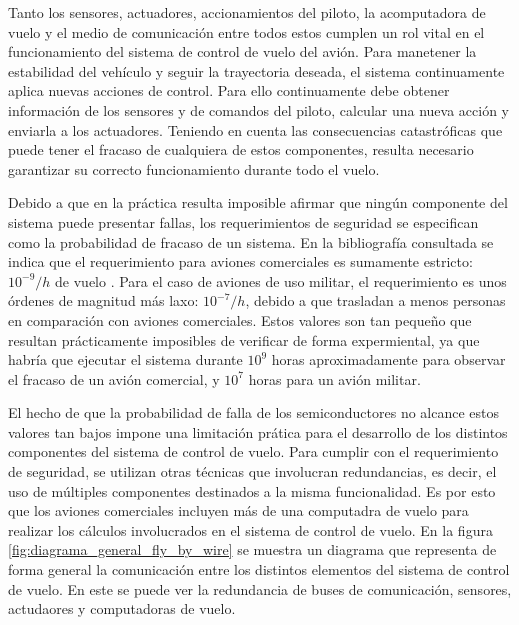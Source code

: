 Tanto los sensores, actuadores, accionamientos del piloto, la acomputadora de vuelo y el medio de comunicación entre todos estos cumplen un rol vital en el funcionamiento del sistema de control de vuelo del avión. Para manetener la estabilidad del vehículo y seguir la trayectoria deseada, el sistema continuamente aplica nuevas acciones de control. Para ello continuamente debe obtener información de los sensores y de comandos del piloto, calcular una nueva acción y enviarla a los actuadores. Teniendo en cuenta las consecuencias catastróficas que puede tener el fracaso de cualquiera de estos componentes, resulta necesario garantizar su correcto funcionamiento durante todo el vuelo.

Debido a que en la práctica resulta imposible afirmar que ningún componente del sistema puede presentar fallas, los requerimientos de seguridad se especifican como la probabilidad de fracaso de un sistema. En la bibliografía consultada se indica que el requerimiento para aviones comerciales es sumamente estricto: $10^{-9}/h$ de vuelo \cite[p.~217]{collinson2023introduction} \cite{yeh1996triple} \cite{lala1994architectural}. Para el caso de aviones de uso militar, el requerimiento es unos órdenes de magnitud más laxo: $10^{-7}/h$, debido a que trasladan a menos personas en comparación con aviones comerciales. Estos valores son tan pequeño que resultan prácticamente imposibles de verificar de forma expermiental, ya que habría que ejecutar el sistema durante $10^9$ horas aproximadamente para observar el fracaso de un avión comercial, y $10^7$ horas para un avión militar.

El hecho de que la probabilidad de falla de los semiconductores no alcance estos valores tan bajos \cite[p.~4]{Fulton2014AirborneEH} impone una limitación prática para el desarrollo de los distintos componentes del sistema de control de vuelo. Para cumplir con el requerimiento de seguridad, se utilizan otras técnicas que involucran redundancias, es decir, el uso de múltiples componentes destinados a la misma funcionalidad. Es por esto que los aviones comerciales incluyen más de una computadra de vuelo para realizar los cálculos involucrados en el sistema de control de vuelo. En la figura \ref{fig:diagrama_general_fly_by_wire} se muestra un diagrama que representa de forma general la comunicación entre los distintos elementos del sistema de control de vuelo. En este se puede ver la redundancia de buses de comunicación, sensores, actudaores y computadoras de vuelo.



